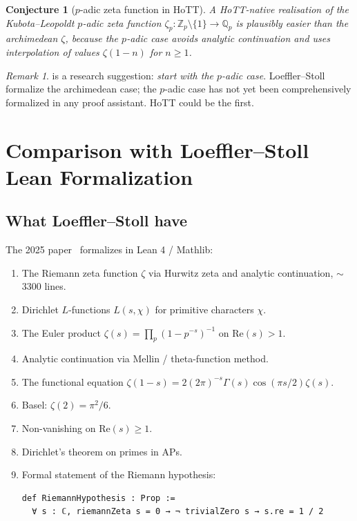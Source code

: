 \documentclass[12pt]{article}
\newtheorem{conjecture}[theorem]{Conjecture}
\theoremstyle{definition}
\theoremstyle{remark}
\newtheorem{remark}[theorem]{Remark}
\newcommand{\Q}{\mathbb{Q}}
\newcommand{\Z}{\mathbb{Z}}
\begin{document}
\begin{conjecture}[$p$-adic zeta function in HoTT]\label{conj:padicZeta}
A HoTT-native realisation of the Kubota--Leopoldt $p$-adic zeta function
$\zeta_p:\Z_p \setminus \{1\} \to \Q_p$ is plausibly easier than the
archimedean $\zeta$, because the $p$-adic case avoids analytic continuation
and uses interpolation of values $\zeta(1-n)$ for $n \geq 1$.
\end{conjecture}

\begin{remark}\label{rem:padicEasier}
 is a research suggestion: \emph{start with the $p$-adic
case}. Loeffler--Stoll formalize the archimedean case; the $p$-adic case has
not yet been comprehensively formalized in any proof assistant. HoTT could
be the first.
\end{remark}

\section{Comparison with Loeffler--Stoll Lean Formalization}\label{sec:loefflerstoll}

\subsection{What Loeffler--Stoll have}

The 2025 paper~\cite{LoefflerStoll2025} formalizes in Lean 4 / Mathlib:
\begin{enumerate}
\item The Riemann zeta function $\zeta$ via Hurwitz zeta and analytic
continuation, $\sim$ 3300 lines.
\item Dirichlet $L$-functions $L(s,\chi)$ for primitive characters $\chi$.
\item The Euler product $\zeta(s) = \prod_p (1-p^{-s})^{-1}$ on
$\mathrm{Re}(s)>1$.
\item Analytic continuation via Mellin / theta-function method.
\item The functional equation $\zeta(1-s) = 2(2\pi)^{-s}\Gamma(s)
\cos(\pi s/2)\zeta(s)$.
\item Basel: $\zeta(2) = \pi^2/6$.
\item Non-vanishing on $\mathrm{Re}(s) \geq 1$.
\item Dirichlet's theorem on primes in APs.
\item Formal statement of the Riemann hypothesis:
\begin{verbatim}
def RiemannHypothesis : Prop :=
  ∀ s : ℂ, riemannZeta s = 0 → ¬ trivialZero s → s.re = 1 / 2
\end{verbatim}
\end{enumerate}
\end{document}
